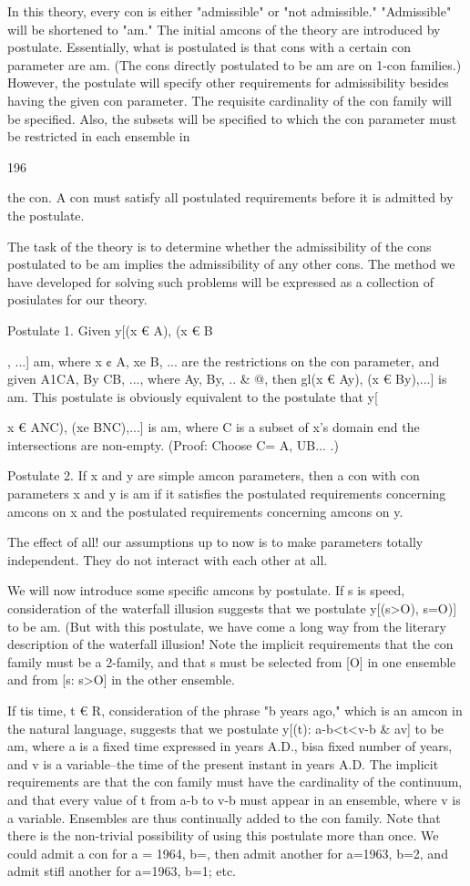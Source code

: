 \documentclass[10pt,twoside]{memoir}
\begin{document}
\begin{enumerate}
{{{{{In this theory, every con is either "admissible" or "not admissible." 
"Admissible" will be shortened to "am." The initial amcons of the theory 
are introduced by postulate. Essentially, what is postulated is that cons with 
a certain con parameter are am. (The cons directly postulated to be am are 
on 1-con families.) However, the postulate will specify other requirements for 
admissibility besides having the given con parameter. The requisite 
cardinality of the con family will be specified. Also, the subsets will be 
specified to which the con parameter must be restricted in each ensemble in 


196 


the con. A con must satisfy all postulated requirements before it is admitted 
by the postulate. 

The task of the theory is to determine whether the admissibility of the 
cons postulated to be am implies the admissibility of any other cons. The 
method we have developed for solving such problems will be expressed as a 
collection of posiulates for our theory. 

Postulate 1. Given y[(x € A), (x € B}, ...] am, where x ¢ A, xe B, ... are the 
restrictions on the con parameter, and given A1CA, By CB, ..., where Ay, By, 
.. & @, then gl(x € Ay), (x € By),...] is am. This postulate is obviously 
equivalent to the postulate that y[{x € ANC), (xe BNC),...] is am, where C is 
a subset of x's domain end the intersections are non-empty. (Proof: Choose 
C= A, UB... .) 

Postulate 2. If x and y are simple amcon parameters, then a con with con 
parameters x and y is am if it satisfies the postulated requirements 
concerning amcons on x and the postulated requirements concerning amcons 
on y. 

The effect of all! our assumptions up to now is to make parameters 
totally independent. They do not interact with each other at all. 

We will now introduce some specific amcons by postulate. If s is speed, 
consideration of the waterfall illusion suggests that we postulate y[(s>O), 
{s=O)] to be am. (But with this postulate, we have come a long way from 
the literary description of the waterfall illusion! } Note the implicit 
requirements that the con family must be a 2-family, and that s must be 
selected from [O] in one ensemble and from [s: s>O] in the other ensemble. 

If tis time, t € R, consideration of the phrase "b years ago," which is an 
amcon in the natural language, suggests that we postulate y[(t): a-b<t<v-b & 
av] to be am, where a is a fixed time expressed in years A.D., bisa fixed 
number of years, and v is a variable--the time of the present instant in years 
A.D. The implicit requirements are that the con family must have the 
cardinality of the continuum, and that every value of t from a-b to v-b must 
appear in an ensemble, where v is a variable. Ensembles are thus continually 
added to the con family. Note that there is the non-trivial possibility of using 
this postulate more than once. We could admit a con for a = 1964, b=, 
then admit another for a=1963, b=2, and admit stifl another for a=1963, 
b=1; etc. 

}}}}}
\end{enumerate}
\end{document}

